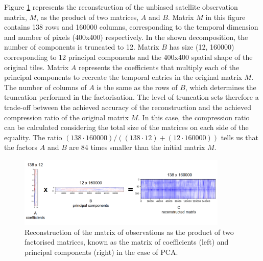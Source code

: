 \documentclass[essd, manuscript]{copernicus}
\begin{document}
Figure \ref{factorisation} represents the reconstruction of the unbiased satellite observation matrix, $M$, as the product of two matrices, $A$ and $B$. Matrix $M$ in this figure contains 138 rows and 160000 columns, corresponding to the temporal dimension and number of pixels (400x400) respectively. In the shown decomposition, the number of components is truncated to 12. Matrix $B$ has size (12, 160000) corresponding to 12 principal components and the 400x400 spatial shape of the original tiles. Matrix $A$ represents the coefficients that multiply each of the principal components to recreate the temporal entries in the original matrix $M$. The number of columns of $A$ is the same as the rows of $B$, which determines the truncation performed in the factorisation. The level of truncation sets therefore a trade-off between the achieved accuracy of the reconstruction and the achieved compression ratio of the original matrix $M$. In this case, the compression ratio can be calculated considering the total size of the matrices on each side of the equality. The ratio $(138 \cdot 160000) / ((138 \cdot 12) + (12 \cdot 160000))$ tells us that the factors $A$ and $B$ are 84 times smaller than the initial matrix $M$. 

\begin{figure}%
    \includegraphics[width=10cm]{fig3.png}
	\caption{Reconstruction of the matrix of observations as the product of two factorised matrices, known as the matrix of coefficients (left) and principal components (right) in the case of PCA.}%
    \label{factorisation}%
\end{figure}
\end{document}
